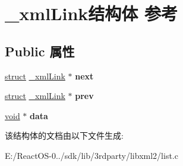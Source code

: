 \hypertarget{struct__xml_link}{}\section{\+\_\+xml\+Link结构体 参考}
\label{struct__xml_link}
\subsection*{Public 属性}
\begin{DoxyCompactItemize}
\item 
\mbox{\label{struct__xml_link_a9757f4af7556432076b1e4a85ba1e877}} 
\hyperlink{interfacestruct}{struct} \hyperlink{struct__xml_link}{\+\_\+xml\+Link} $\ast$ {\bfseries next}
\item 
\mbox{\label{struct__xml_link_acb00bdb2cc98cd2c1a5037d86fac2917}} 
\hyperlink{interfacestruct}{struct} \hyperlink{struct__xml_link}{\+\_\+xml\+Link} $\ast$ {\bfseries prev}
\item 
\mbox{\label{struct__xml_link_a7787975913c1fc225cd3c538bb282c35}} 
\hyperlink{interfacevoid}{void} $\ast$ {\bfseries data}
\end{DoxyCompactItemize}


该结构体的文档由以下文件生成\+:\begin{DoxyCompactItemize}
\item 
E\+:/\+React\+O\+S-\/0../sdk/lib/3rdparty/libxml2/list.\+c\end{DoxyCompactItemize}
